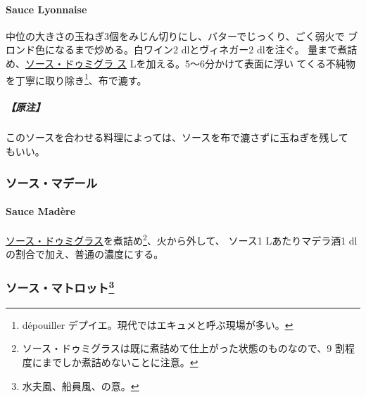 \hypertarget{sauce-lyonnaise}{%
\paragraph{Sauce Lyonnaise}\label{sauce-lyonnaise}}

   

中位の大きさの玉ねぎ3個をみじん切りにし、バターでじっくり、ごく弱火で
ブロンド色になるまで炒める。白ワイン2 dlとヴィネガー2 dlを注ぐ。
\untiers{}量まで煮詰め、\protect\hyperlink{sauce-demi-glace}{ソース・ドゥミグラ
ス}\troisquarts{} Lを加える。5〜6分かけて表面に浮い
てくる不純物を丁寧に取り除き\footnote{dépouiller
  デプイエ。現代ではエキュメと呼ぶ現場が多い。}、布で漉す。

\hypertarget{ux539fux6ce8-5}{%
\subparagraph{【原注】}\label{ux539fux6ce8-5}}

このソースを合わせる料理によっては、ソースを布で漉さずに玉ねぎを残して
もいい。

\maeaki

\hypertarget{ux30bdux30fcux30b9ux30deux30c7ux30fcux30eb}{%
\subsubsection{ソース・マデール}\label{ux30bdux30fcux30b9ux30deux30c7ux30fcux30eb}}

\hypertarget{sauce-madere}{%
\paragraph{Sauce Madère}\label{sauce-madere}}

  

\protect\hyperlink{sauce-demi-glace}{ソース・ドゥミグラス}を煮詰め\footnote{ソース・ドゥミグラスは既に煮詰めて仕上がった状態のものなので、9
  割程度にまでしか煮詰めないことに注意。}、火から外して、 ソース1
Lあたりマデラ酒1 dlの割合で加え、普通の濃度にする。

\maeaki

\hypertarget{ux30bdux30fcux30b9ux30deux30c8ux30edux30c3ux30c854}{%
\subsubsection[ソース・マトロット]{\texorpdfstring{ソース・マトロット\footnote{水夫風、船員風、の意。}}{ソース・マトロット}}\label{ux30bdux30fcux30b9ux30deux30c8ux30edux30c3ux30c854}}

